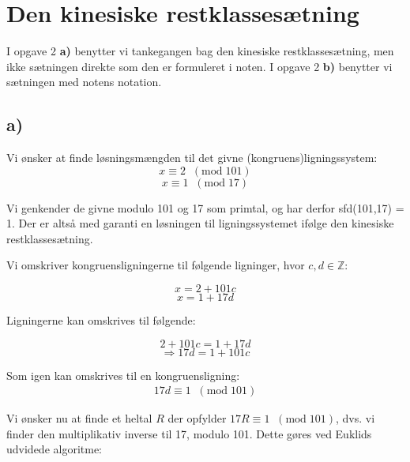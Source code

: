 \section{Den kinesiske restklassesætning}

I opgave 2 \textbf{a)} benytter vi tankegangen bag den kinesiske restklassesætning, men ikke sætningen direkte som den er formuleret i noten. I opgave 2 \textbf{b)} benytter vi sætningen med notens notation.

\subsection*{a)}

Vi ønsker at finde løsningsmængden til det givne (kongruens)ligningssystem:
\begin{equation}\label{eq:2a1}
x \equiv 2 \; \; (\text{mod} \; 101)
\end{equation}
\begin{equation}\label{eq:2a2}
x \equiv 1 \; \; (\text{mod} \; 17 )
\end{equation}

Vi genkender de givne modulo 101 og 17 som primtal, og har derfor sfd(101,17) = 1. Der er altså med garanti en løsningen til ligningssystemet ifølge den kinesiske restklassesætning. 

Vi omskriver kongruensligningerne til følgende ligninger, hvor $c,d \in \mathds{Z}$:

\begin{equation}
x = 2 + 101c
\end{equation}
\begin{equation}\label{eq:xd}
 x = 1+17d
\end{equation}

Ligningerne kan omskrives til følgende:

\begin{equation}
2 + 101c = 1 + 17d
\end{equation}
\begin{equation}
\Rightarrow  17d = 1 + 101c
\end{equation}

Som igen kan omskrives til en kongruensligning:
\begin{gather}\label{eq:17d}
    17 d \equiv 1 \; \; (\text{mod} \; 101)
\end{gather}

Vi ønsker nu at finde et heltal $R$ der opfylder $17R \equiv 1 \; \; (\text{mod} \; 101)$, dvs. vi finder den multiplikativ inverse til 17, modulo 101. Dette gøres ved Euklids udvidede algoritme: 


